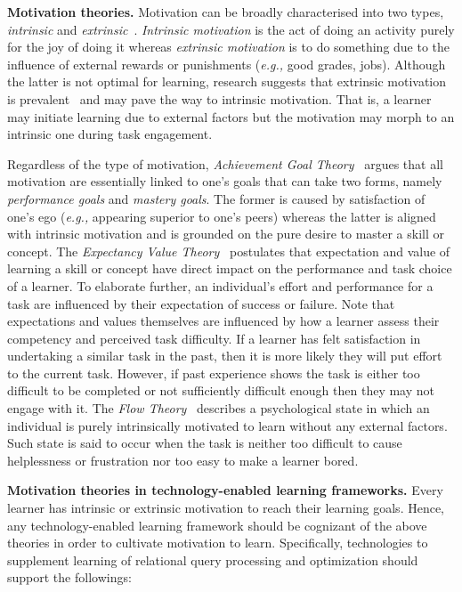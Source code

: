 \documentclass[11pt]{article}
\newcommand{\eg}{\emph{e.g.,}\xspace}
\begin{document}
\vspace{1ex} \noindent \textbf{Motivation theories.} Motivation can be broadly characterised into two types,\textit{ intrinsic} and \textit{extrinsic}~\cite{RD00}.\textit{ Intrinsic motivation} is the act of doing an activity purely for the joy of doing it whereas \textit{extrinsic motivation} is to do something due to the influence of external  rewards or punishments (\eg good grades, jobs). Although the latter is not optimal for learning, research suggests that extrinsic motivation is prevalent~\cite{RD00,DV+91} and may pave the way to intrinsic motivation. That is, a learner may initiate learning due to external factors but the motivation may morph to an intrinsic one during task engagement. 
 
Regardless of the type of motivation, \textit{Achievement Goal Theory}~\cite{AP12} argues that all motivation are essentially linked to one's goals that can take two forms, namely \textit{performance goals} and \textit{mastery goals}. The former is caused by satisfaction of one's ego (\eg appearing superior to one's peers) whereas the latter is aligned with intrinsic motivation and is grounded on the pure desire to master a skill or concept. The \textit{Expectancy Value Theory}~\cite{WE00} postulates that expectation and value of learning a skill or concept have direct impact on the performance and task choice of a learner. To elaborate further,  an individual's effort and performance for a task are influenced by their expectation of success or failure.  Note that expectations and values themselves are influenced by how a learner assess their competency and perceived task difficulty.  If a learner has felt satisfaction in undertaking a similar task in the past, then it is more likely they will put effort to the current task.  However, if past experience shows the task is either too difficult to be completed or not sufficiently difficult enough then they may not engage with it. The \textit{Flow Theory}~\cite{NL09} describes a  psychological state in which an individual is purely intrinsically motivated to learn without any external factors. Such state is said to occur when the task is neither too difficult to cause helplessness or frustration nor too easy to make a learner bored. 

\vspace{1ex} \noindent\textbf{Motivation theories in technology-enabled learning frameworks.} Every learner has intrinsic or extrinsic motivation to reach their learning goals. Hence, any technology-enabled learning framework should be cognizant of the above theories in order to cultivate motivation to learn. Specifically, technologies to supplement learning of relational query processing and optimization should support the followings:
\end{document}
